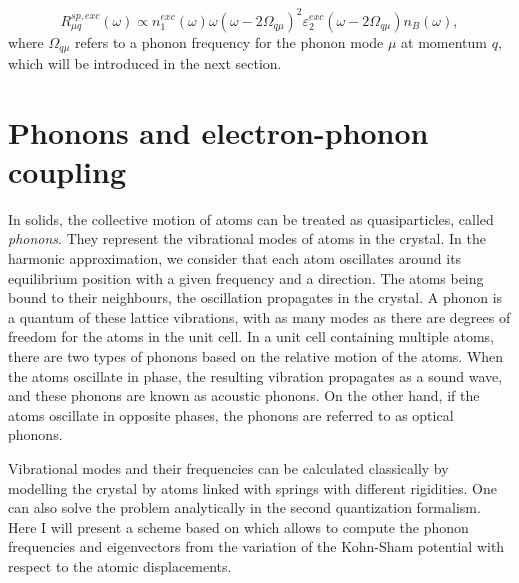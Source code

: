 \begin{equation}
	R^{sp,exc}_{\mu q}(\omega) \propto n_1^{exc}(\omega) \omega(\omega - 2 \Omega_{q\mu})^2 \varepsilon^{exc}_2(\omega - 2\Omega_{q\mu})n_{B}(\omega), \label{eq:vRS_PL_ind}
\end{equation}
where $\Omega_{q\mu}$ refers to a phonon frequency for the phonon mode $\mu$ at momentum $q$, which will be introduced in the next section.

%
%
\section{Phonons and electron-phonon coupling}
In solids, the collective motion of atoms can be treated as quasiparticles, called \textit{phonons}. They represent the vibrational modes of atoms in the crystal. In the harmonic approximation, we consider that each atom oscillates around its equilibrium position with a given frequency and a direction. 
The atoms being bound to their neighbours, the oscillation propagates in the crystal. A phonon is a quantum of these lattice vibrations, with as many modes as there are degrees of freedom for the atoms in the unit cell. 
In a unit cell containing multiple atoms, there are two types of phonons based on the relative motion of the atoms. When the atoms oscillate in phase, the resulting vibration propagates as a sound wave, and these phonons are known as acoustic phonons. On the other hand, if the atoms oscillate in opposite phases, the phonons are referred to as optical phonons.

Vibrational modes and their frequencies can be calculated classically by modelling the crystal by atoms linked with springs with different rigidities. One can also solve the problem analytically in the second quantization formalism. Here I will present a scheme based on  which allows to compute the phonon frequencies and eigenvectors from the variation of the Kohn-Sham potential with respect to the atomic displacements. 

